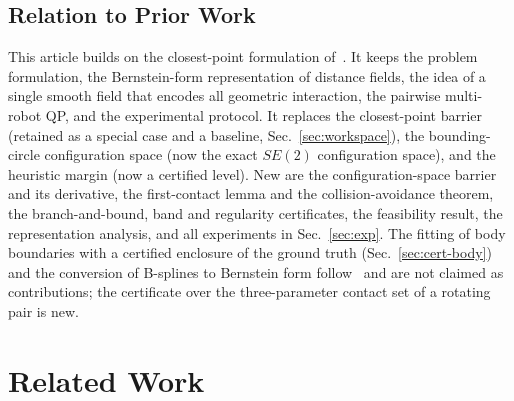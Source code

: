 \documentclass[journal]{IEEEtran}
\theoremstyle{definition}
\begin{document}
\subsection{Relation to Prior Work}\label{sec:relation}
This article builds on the closest-point formulation of~\cite{jo2026geometry}. It keeps the problem
formulation, the Bernstein-form representation of distance fields, the idea of a single smooth
field that encodes all geometric interaction, the pairwise multi-robot QP, and the experimental
protocol. It replaces the closest-point barrier (retained as a special case and a baseline,
Sec.~\ref{sec:workspace}), the bounding-circle configuration space (now the exact $SE(2)$
configuration space), and the heuristic margin (now a certified level). New are the
configuration-space barrier and its derivative, the first-contact lemma and the collision-avoidance
theorem, the branch-and-bound, band and regularity certificates, the feasibility result, the
representation analysis, and all experiments in Sec.~\ref{sec:exp}. The fitting of body boundaries
with a certified enclosure of the ground truth (Sec.~\ref{sec:cert-body}) and the conversion of
B-splines to Bernstein form follow~\cite{jo2027semantic} and are not claimed as contributions; the
certificate over the three-parameter contact set of a rotating pair is new.

\section{Related Work}\label{sec:related}
\end{document}
